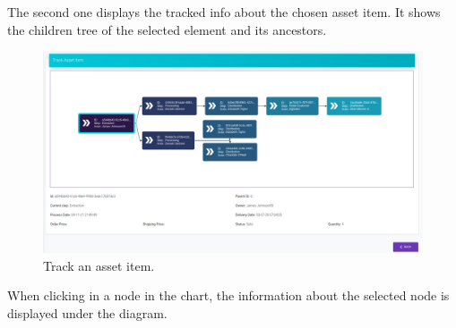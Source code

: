 The second one displays the tracked info about the chosen asset item. It shows the children tree of the selected element and its ancestors.

\begin{figure}[H]
\begin{center}
  \includegraphics[scale=0.275]{images/use_example/092_track_asset_Item.png}
\caption{Track an asset item.}
\label{fig:track_asset_item}
\end{center}
\end{figure}

When clicking in a node in the chart, the information about the selected node is displayed under the diagram.